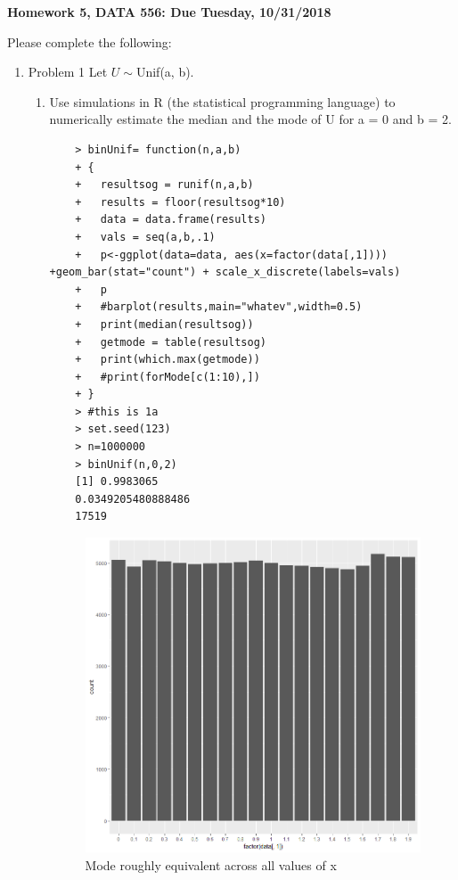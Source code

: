 \documentclass[11pt]{article}
\begin{document}
\begin{title}
	{\Large\bf Homework 5, DATA 556: Due Tuesday, 10/31/2018}
\end{title}

\author{\bf Alexander Van Roijen}

\maketitle

\newpage
Please complete the following:
\begin{enumerate}
\item Problem 1
Let $U \sim $Unif(a, b).
\begin{enumerate}
	\item Use simulations in R (the statistical programming language) to numerically estimate the median and
	the mode of U for a = 0 and b = 2.
	\begin{verbatim}
	> binUnif= function(n,a,b)
	+ {
	+   resultsog = runif(n,a,b)
	+   results = floor(resultsog*10)
	+   data = data.frame(results)
	+   vals = seq(a,b,.1)
	+   p<-ggplot(data=data, aes(x=factor(data[,1]))) +geom_bar(stat="count") + scale_x_discrete(labels=vals)
	+   p
	+   #barplot(results,main="whatev",width=0.5)
	+   print(median(resultsog))
	+   getmode = table(resultsog)
	+   print(which.max(getmode))
	+   #print(forMode[c(1:10),])
	+ }
	> #this is 1a
	> set.seed(123)
	> n=1000000
	> binUnif(n,0,2)
	[1] 0.9983065
	0.0349205480888486 
	17519 
	\end{verbatim}
	\begin{figure}[H]
		\centering
		\caption{Mode roughly equivalent across all values of x}
		\includegraphics[scale=.6]{Rplot.png}

\end{figure}
\end{enumerate}
\end{enumerate}
\end{document}
